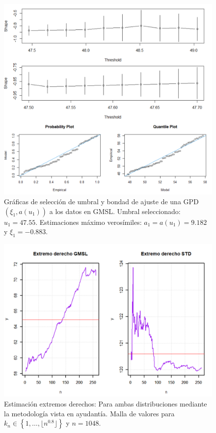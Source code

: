 \documentclass[10.5pt,notitlepage]{article}
\newcommand{\kis}[1]{\left\{ #1 \right\}}
\newcommand{\floor}[1]{\lfloor #1 \rfloor}
\theoremstyle{plain}
\begin{document}
\begin{figure}[htb]
    \centering
    \includegraphics[scale = 0.4]{Incisob/AP1.png}
    \caption{Gráficas de selección de umbral y bondad de ajuste de una GPD\((\xi_1,a(u_1))\) a los datos en GMSL. Umbral seleccionado: \(u_1 = 47.55\). Estimaciones máximo verosímiles: \(a_1 =a(u_1) = 9.182\) y \(\xi_1 =  -0.883\).}
    \label{fig:6}
\end{figure}

\begin{figure}[htb]
    \centering
    \includegraphics[scale = 0.5]{Incisob/EXTREMOSDERES.png}
    \caption{Estimación extremos derechos: Para ambas distribuciones mediante la metodología vista en ayudantía. Malla de valores para \(k_{n} \in \kis{1, \hdots, \floor{n^{0.8}}}\) y \(n = 1048\).}
    \label{fig:6.1}
\end{figure}
\end{document}
